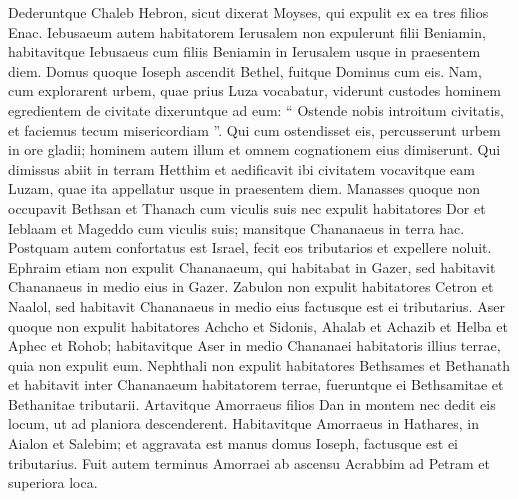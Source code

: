 \begin{biblechapter}
\verse Dederuntque Chaleb Hebron, sicut dixerat Moyses, qui expulit ex ea tres filios Enac.
 \verse Iebusaeum autem habitatorem Ierusalem non expulerunt filii Beniamin, habitavitque Iebusaeus cum filiis Beniamin in Ierusalem usque in praesentem diem.
 \verse Domus quoque Ioseph ascendit Bethel, fuitque Dominus cum eis. 
\verse Nam, cum explorarent urbem, quae prius Luza vocabatur, 
\verse viderunt custodes hominem egredientem de civitate dixeruntque ad eum: “ Ostende nobis introitum civitatis, et faciemus tecum misericordiam ”. 
\verse Qui cum ostendisset eis, percusserunt urbem in ore gladii; hominem autem illum et omnem cognationem eius dimiserunt. 
 \verse Qui dimissus abiit in terram Hetthim et aedificavit ibi civitatem vocavitque eam Luzam, quae ita appellatur usque in praesentem diem.
 \verse Manasses quoque non occupavit Bethsan et Thanach cum viculis suis nec expulit habitatores Dor et Ieblaam et Mageddo cum viculis suis; mansitque Chananaeus in terra hac. 
\verse Postquam autem confortatus est Israel, fecit eos tributarios et expellere noluit. 
\verse Ephraim etiam non expulit Chananaeum, qui habitabat in Gazer, sed habitavit Chananaeus in medio eius in Gazer.
 \verse Zabulon non expulit habitatores Cetron et Naalol, sed habitavit Chananaeus in medio eius factusque est ei tributarius.
 \verse Aser quoque non expulit habitatores Achcho et Sidonis, Ahalab et Achazib et Helba et Aphec et Rohob; 
\verse habitavitque Aser in medio Chananaei habitatoris illius terrae, quia non expulit eum.
 \verse Nephthali non expulit habitatores Bethsames et Bethanath et habitavit inter Chananaeum habitatorem terrae, fueruntque ei Bethsamitae et Bethanitae tributarii.
 \verse Artavitque Amorraeus filios Dan in montem nec dedit eis locum, ut ad planiora descenderent. 
\verse Habitavitque Amorraeus in Hathares, in Aialon et Salebim; et aggravata est manus domus Ioseph, factusque est ei tributarius. 
\verse Fuit autem terminus Amorraei ab ascensu Acrabbim ad Petram et superiora loca.
 

\end{biblechapter}
